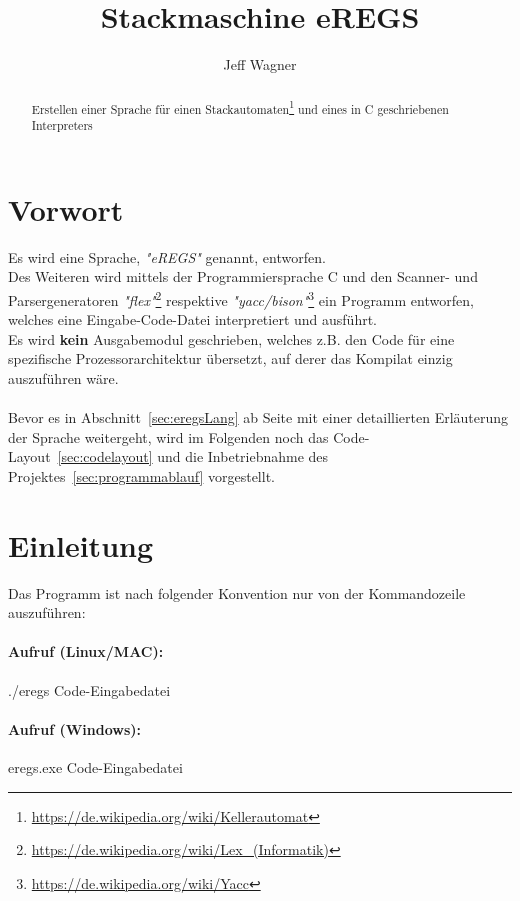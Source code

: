\documentclass{article}
\begin{document}
\title{Stackmaschine eREGS}
\author{Jeff Wagner}
\maketitle

\begin{abstract}
Erstellen einer Sprache für einen Stackautomaten\footnote{\url{https://de.wikipedia.org/wiki/Kellerautomat}} und eines in C geschriebenen Interpreters
\end{abstract}

\section{Vorwort}
\label{sec:vorwort}
Es wird eine Sprache, \textit{"eREGS"} genannt, entworfen.\\ 
Des Weiteren wird mittels der Programmiersprache C und den Scanner- und Parsergeneratoren \textit{"flex"}\footnote{\url{https://de.wikipedia.org/wiki/Lex_(Informatik)}} respektive \textit{"yacc/bison"}\footnote{\url{https://de.wikipedia.org/wiki/Yacc}} ein Programm entworfen, 
welches eine Eingabe-Code-Datei interpretiert und ausführt.\\
Es wird \textbf{kein} Ausgabemodul geschrieben, welches z.B. den Code für eine spezifische Prozessorarchitektur übersetzt, auf derer das Kompilat einzig auszuführen wäre.
\\\\
Bevor es in Abschnitt~\ref{sec:eregsLang} ab Seite \pageref{sec:eregsLang} mit einer detaillierten Erläuterung der Sprache weitergeht, wird im Folgenden noch das 
Code-Layout~\ref{sec:codelayout} und die Inbetriebnahme 
des Projektes~\ref{sec:programmablauf} vorgestellt.
\newpage

\section{Einleitung}
\label{sec:einleitung}
Das Programm ist nach folgender Konvention nur von der Kommandozeile auszuführen:
\paragraph{Aufruf (Linux/MAC): } ./eregs Code-Eingabedatei
\paragraph{Aufruf (Windows): } eregs.exe Code-Eingabedatei 

\hfill\break
\end{document}
